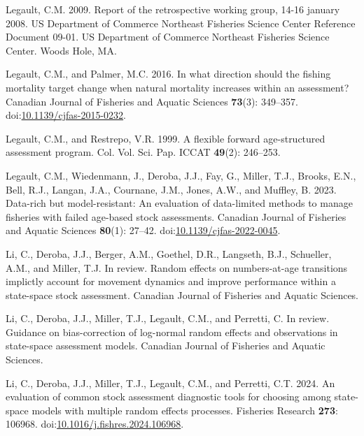 \documentclass[
  12pt,
]{article}
\newlength{\cslhangindent}
\newenvironment{CSLReferences}[2] %
 {\begin{list}{}{%
  \setlength{\itemindent}{0pt} %
  \setlength{\leftmargin}{0pt} %
  \setlength{\parsep}{0pt} %
  \ifodd #1
   \setlength{\leftmargin}{\cslhangindent} %
   \setlength{\itemindent}{-1\cslhangindent} %
  \fi
  \setlength{\itemsep}{#2\baselineskip}}} %
 {\end{list}} %
\begin{document}
\begin{CSLReferences}{1}{0}
Legault, C.M. 2009. Report of the retrospective working group, 14-16
january 2008. US Department of Commerce Northeast Fisheries Science
Center Reference Document 09-01. US Department of Commerce Northeast
Fisheries Science Center. Woods Hole, MA.

Legault, C.M., and Palmer, M.C. 2016. In what direction should the
fishing mortality target change when natural mortality increases within
an assessment? Canadian Journal of Fisheries and Aquatic Sciences
\textbf{73}(3): 349--357.
doi:\href{https://doi.org/10.1139/cjfas-2015-0232}{10.1139/cjfas-2015-0232}.

Legault, C.M., and Restrepo, V.R. 1999. A flexible forward
age-structured assessment program. Col. Vol. Sci. Pap. ICCAT
\textbf{49}(2): 246--253.

Legault, C.M., Wiedenmann, J., Deroba, J.J., Fay, G., Miller, T.J.,
Brooks, E.N., Bell, R.J., Langan, J.A., Cournane, J.M., Jones, A.W., and
Muffley, B. 2023. Data-rich but model-resistant: An evaluation of
data-limited methods to manage fisheries with failed age-based stock
assessments. Canadian Journal of Fisheries and Aquatic Sciences
\textbf{80}(1): 27--42.
doi:\href{https://doi.org/10.1139/cjfas-2022-0045}{10.1139/cjfas-2022-0045}.

Li, C., Deroba, J.J., Berger, A.M., Goethel, D.R., Langseth, B.J.,
Schueller, A.M., and Miller, T.J. In review. Random effects on
numbers-at-age transitions implictly account for movement dynamics and
improve performance within a state-space stock assessment. Canadian
Journal of Fisheries and Aquatic Sciences.

Li, C., Deroba, J.J., Miller, T.J., Legault, C.M., and Perretti, C. In
review. Guidance on bias-correction of log-normal random effects and
observations in state-space assessment models. Canadian Journal of
Fisheries and Aquatic Sciences.

Li, C., Deroba, J.J., Miller, T.J., Legault, C.M., and Perretti, C.T.
2024. An evaluation of common stock assessment diagnostic tools for
choosing among state-space models with multiple random effects
processes. Fisheries Research \textbf{273}: 106968.
doi:\href{https://doi.org/10.1016/j.fishres.2024.106968}{10.1016/j.fishres.2024.106968}.


\end{CSLReferences}
\end{document}
